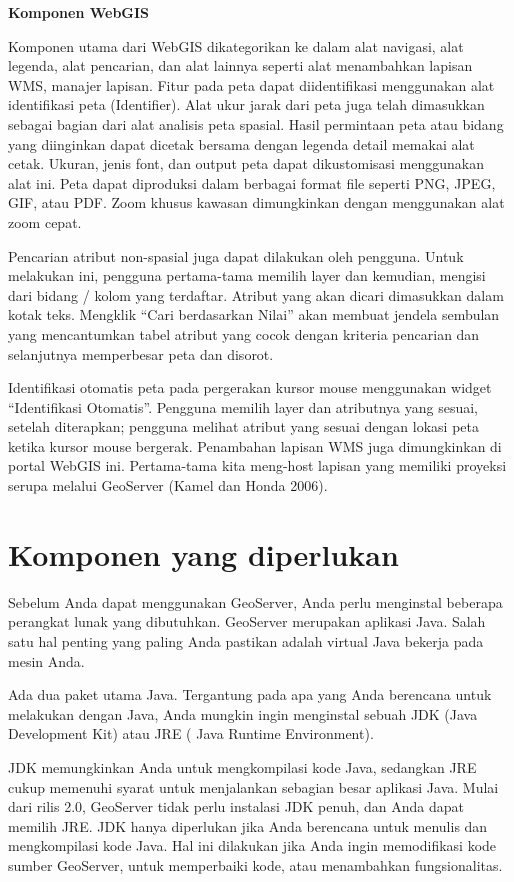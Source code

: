 \documentclass[]{book}
\begin{document}
\textbf{Komponen WebGIS}

Komponen utama dari WebGIS dikategorikan ke dalam alat navigasi, alat legenda, alat pencarian, dan alat lainnya seperti alat menambahkan lapisan WMS, manajer lapisan. Fitur pada peta dapat diidentifikasi menggunakan alat identifikasi peta (Identifier). Alat ukur jarak dari peta juga telah dimasukkan sebagai bagian dari alat analisis peta spasial. Hasil permintaan peta atau bidang yang diinginkan dapat dicetak bersama dengan legenda detail memakai alat cetak. Ukuran, jenis font, dan output peta dapat dikustomisasi menggunakan alat ini. Peta dapat diproduksi dalam berbagai format file seperti PNG, JPEG, GIF, atau PDF. Zoom khusus kawasan dimungkinkan dengan menggunakan alat zoom cepat.

Pencarian atribut non-spasial juga dapat dilakukan oleh pengguna. Untuk melakukan ini, pengguna pertama-tama memilih layer dan kemudian, mengisi dari bidang / kolom yang terdaftar. Atribut yang akan dicari dimasukkan dalam kotak teks. Mengklik ``Cari berdasarkan Nilai'' akan membuat jendela sembulan yang mencantumkan tabel atribut yang cocok dengan kriteria pencarian dan selanjutnya memperbesar peta dan disorot.

Identifikasi otomatis peta pada pergerakan kursor mouse menggunakan widget ``Identifikasi Otomatis''. Pengguna memilih layer dan atributnya yang sesuai, setelah diterapkan; pengguna melihat atribut yang sesuai dengan lokasi peta ketika kursor mouse bergerak. Penambahan lapisan WMS juga dimungkinkan di portal WebGIS ini. Pertama-tama kita meng-host lapisan yang memiliki proyeksi serupa melalui GeoServer (Kamel dan Honda 2006).

\hypertarget{komponen-yang-diperlukan}{%
\section{Komponen yang diperlukan}\label{komponen-yang-diperlukan}}

Sebelum Anda dapat menggunakan GeoServer, Anda perlu menginstal beberapa perangkat lunak yang dibutuhkan. GeoServer merupakan aplikasi Java. Salah satu hal penting yang paling
Anda pastikan adalah virtual Java bekerja pada mesin Anda.

Ada dua paket utama Java. Tergantung pada apa yang Anda berencana untuk melakukan dengan Java, Anda mungkin
ingin menginstal sebuah JDK (Java Development Kit) atau JRE
( Java Runtime Environment).

JDK memungkinkan Anda untuk mengkompilasi kode Java, sedangkan JRE cukup memenuhi syarat
untuk menjalankan sebagian besar aplikasi Java. Mulai dari rilis 2.0, GeoServer tidak perlu instalasi JDK penuh, dan Anda
dapat memilih JRE. JDK hanya diperlukan jika Anda berencana untuk menulis dan mengkompilasi kode
Java. Hal ini dilakukan jika Anda ingin memodifikasi kode sumber GeoServer, untuk memperbaiki kode, atau menambahkan
fungsionalitas.
\end{document}
